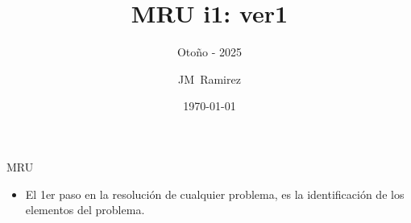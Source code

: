 \documentclass{beamer}
\title{MRU i1: ver1}
\subtitle{Otoño - 2025}
\author{JM~Ramirez}
\date{\today}
\begin{document}
\maketitle

\begin{frame}{MRU}
% 
 


 
\begin{itemize}                                                              

\item El 1er paso en la resoluci\'on de cualquier problema, es la
identificaci\'on de los elementos del problema.            
              
\end{itemize}

\end{frame}
\end{document}
